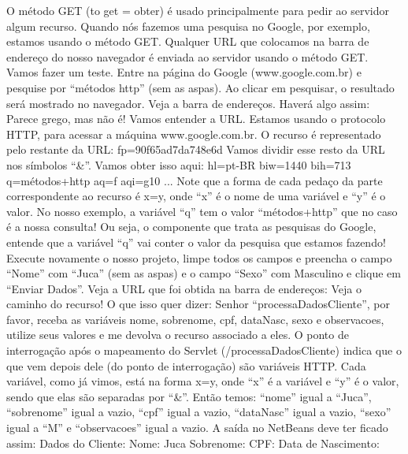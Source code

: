 O método GET (to get = obter) é usado principalmente para pedir ao servidor algum recurso. Quando nós fazemos uma pesquisa no Google, por exemplo, estamos usando o método GET. Qualquer URL que colocamos na barra de endereço do nosso navegador é enviada ao servidor usando o método GET. Vamos fazer um teste. Entre na página do Google (www.google.com.br) e pesquise por “métodos http” (sem as aspas). Ao clicar em pesquisar, o resultado será mostrado no navegador. Veja a barra de endereços. Haverá algo assim:
Parece grego, mas não é! Vamos entender a URL. Estamos usando o protocolo HTTP, para acessar a máquina www.google.com.br. O recurso é representado pelo restante da URL:
fp=90f65ad7da748e6d
Vamos dividir esse resto da URL nos símbolos “\&”. Vamos obter isso aqui:
hl=pt-BR
biw=1440
bih=713
q=métodos+http
aq=f
aqi=g10
...
Note que a forma de cada pedaço da parte correspondente ao recurso é x=y, onde “x” é o nome de uma variável e “y” é o valor. No nosso exemplo, a variável “q” tem o valor “métodos+http” que no caso é a nossa consulta! Ou seja, o componente que trata as pesquisas do Google, entende que a variável “q” vai conter o valor da pesquisa que estamos fazendo!
Execute novamente o nosso projeto, limpe todos os campos e preencha o campo “Nome” com “Juca” (sem as aspas) e o campo “Sexo” com Masculino e clique em “Enviar Dados”. Veja a URL que foi obtida na barra de endereços:
Veja o caminho do recurso!
O que isso quer dizer:
Senhor “processaDadosCliente”, por favor, receba as variáveis nome, sobrenome, cpf, dataNasc, sexo e observacoes, utilize seus valores e me devolva o recurso associado a eles. O ponto de interrogação após o mapeamento do Servlet (/processaDadosCliente) indica que o que vem depois dele (do ponto de interrogação) são variáveis HTTP. Cada variável, como já vimos, está na forma x=y, onde “x” é a variável e “y” é o valor, sendo que elas são separadas por “\&”. Então temos: “nome” igual a “Juca”, “sobrenome” igual a vazio, “cpf” igual a vazio, “dataNasc” igual a vazio, “sexo” igual a “M” e “observacoes” igual a vazio. A saída no NetBeans deve ter ficado assim:
Dados do Cliente:
Nome: Juca
Sobrenome: 
CPF: 
Data de Nascimento: 
